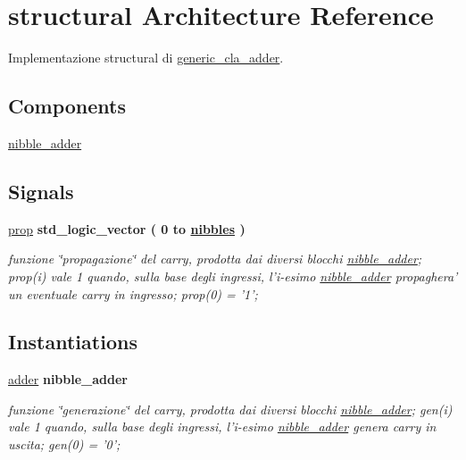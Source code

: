 \hypertarget{classgeneric__cla__adder_1_1structural}{\section{structural Architecture Reference}
\label{classgeneric__cla__adder_1_1structural}
}


Implementazione structural di \hyperlink{classgeneric__cla__adder}{generic\+\_\+cla\+\_\+adder}.  


\subsection*{Components}
 \begin{DoxyCompactItemize}
\item 
\hyperlink{group___carry_loockahead_ga98a3a5b152caf0f2de1e31ac60088369}{nibble\+\_\+adder}  {\bfseries }  
\end{DoxyCompactItemize}
\subsection*{Signals}
 \begin{DoxyCompactItemize}
\item 
\hyperlink{group___carry_loockahead_ga19afe0b89973d7fc29362431f2e828b7}{prop} {\bfseries \textcolor{vhdlchar}{std\+\_\+logic\+\_\+vector}\textcolor{vhdlchar}{ }\textcolor{vhdlchar}{(}\textcolor{vhdlchar}{ }\textcolor{vhdlchar}{ } \textcolor{vhdldigit}{0} \textcolor{vhdlchar}{ }\textcolor{vhdlchar}{to}\textcolor{vhdlchar}{ }\textcolor{vhdlchar}{ }\textcolor{vhdlchar}{ }\textcolor{vhdlchar}{ }{\bfseries \hyperlink{group___carry_loockahead_ga0b63b586531492d0fa882246cca071c1}{nibbles}} \textcolor{vhdlchar}{ }\textcolor{vhdlchar}{)}\textcolor{vhdlchar}{ }} 
\begin{DoxyCompactList}\small\item\em funzione \char`\"{}propagazione\char`\"{} del carry, prodotta dai diversi blocchi \hyperlink{classnibble__adder}{nibble\+\_\+adder}; prop(i) vale 1 quando, sulla base degli ingressi, l'i-\/esimo \hyperlink{classnibble__adder}{nibble\+\_\+adder} propaghera' un eventuale carry in ingresso; prop(0) = '1'; \end{DoxyCompactList}\end{DoxyCompactItemize}
\subsection*{Instantiations}
 \begin{DoxyCompactItemize}
\item 
\hyperlink{classgeneric__cla__adder_1_1structural_a9d7a8a381439c61aea549e7a47ec7a6f}{adder}  {\bfseries nibble\+\_\+adder}   
\begin{DoxyCompactList}\small\item\em funzione \char`\"{}generazione\char`\"{} del carry, prodotta dai diversi blocchi \hyperlink{classnibble__adder}{nibble\+\_\+adder}; gen(i) vale 1 quando, sulla base degli ingressi, l'i-\/esimo \hyperlink{classnibble__adder}{nibble\+\_\+adder} genera carry in uscita; gen(0) = '0'; \end{DoxyCompactList}\end{DoxyCompactItemize}


